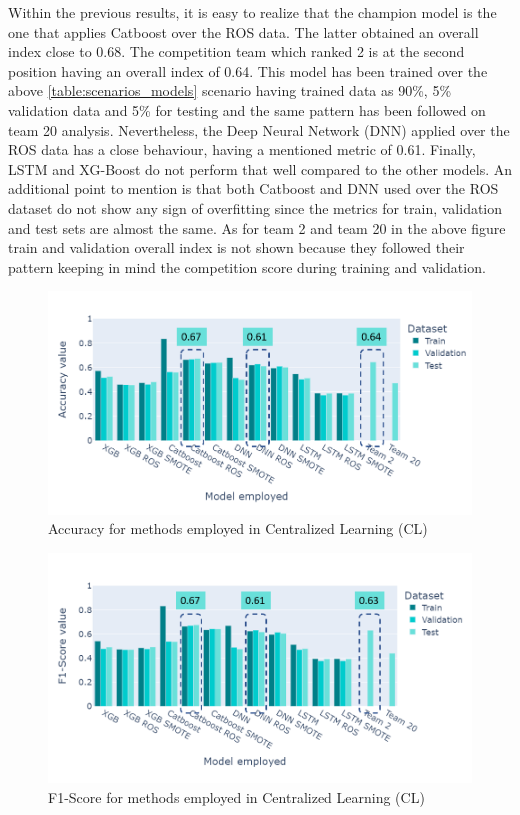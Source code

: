 Within the previous results, it is easy to realize that the champion model is the one that applies Catboost over the ROS data. The latter obtained an overall index close to 0.68. The competition team which ranked 2 is at the second position having an overall index of 0.64. This model has been trained over the above \ref{table:scenarios_models} scenario having trained data as 90\%, 5\% validation data and 5\% for testing and the same pattern has been followed on team 20 analysis. Nevertheless, the Deep Neural Network (DNN) applied over the ROS data has a close behaviour, having a mentioned metric of 0.61. Finally, LSTM and XG-Boost do not perform that well compared to the other models. An additional point to mention is that both Catboost and DNN used over the ROS dataset do not show any sign of overfitting since the metrics for train, validation and test sets are almost the same. As for team 2 and team 20 in the above figure train and validation overall index is not shown because they followed their pattern keeping in mind the competition score during training and validation. 

\begin{figure}[H]
\centering
\includegraphics[scale=0.55]{img/cl_accuracy_methods.png}
\caption{Accuracy for methods employed in Centralized Learning (CL)}
\label{fig:cl_accuracy_methods}
\end{figure}

\newpage

\begin{figure}[H]
\centering
\includegraphics[scale=0.55]{img/cl_f1score_methods.png}
\caption{F1-Score for methods employed in Centralized Learning (CL)}
\label{fig:cl_f1score_methods}
\end{figure}

